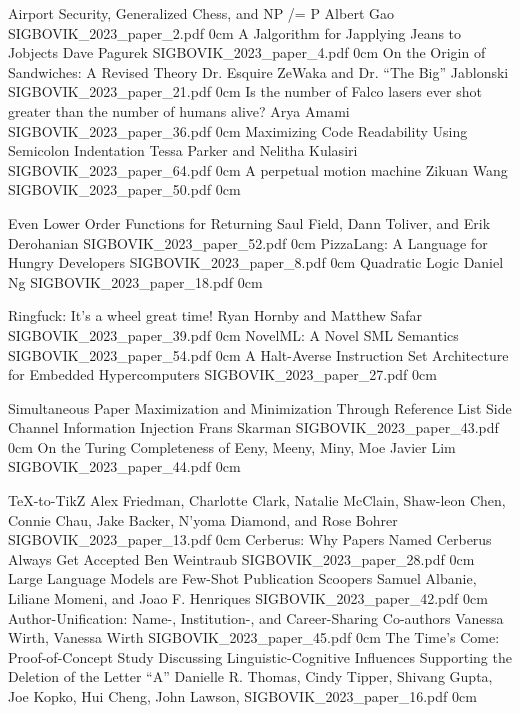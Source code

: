 \addpaper
	{Airport Security, Generalized Chess, and NP /= P}
	{Albert Gao}
	{}
	{SIGBOVIK_2023_paper_2.pdf}
	{0cm}
	{}
\addpaper
	{A Jalgorithm for Japplying Jeans to Jobjects}
	{Dave Pagurek}
	{}
	{SIGBOVIK_2023_paper_4.pdf}
	{0cm}
	{}
\addpaper
	{On the Origin of Sandwiches: A Revised Theory}
	{Dr. Esquire ZeWaka and Dr. ``The Big'' Jablonski}
	{}
	{SIGBOVIK_2023_paper_21.pdf}
	{0cm}
	{}
\addpaper
	{Is the number of Falco lasers ever shot greater than the number of humans alive?}
	{Arya Amami}
	{}
	{SIGBOVIK_2023_paper_36.pdf}
	{0cm}
	{}
\addpaper
	{Maximizing Code Readability Using Semicolon Indentation}
	{Tessa Parker and Nelitha Kulasiri}
	{}
	{SIGBOVIK_2023_paper_64.pdf}
	{0cm}
	{}
\addpaper
	{A perpetual motion machine}
	{Zikuan Wang}
	{}
	{SIGBOVIK_2023_paper_50.pdf}
	{0cm}
	{}


\addpaper
	{Even Lower Order Functions for Returning}
	{Saul Field, Dann Toliver, and Erik Derohanian }
	{}
	{SIGBOVIK_2023_paper_52.pdf}
	{0cm}
	{}
\addpaper
	{PizzaLang: A Language for Hungry Developers}
	{}
	{}
	{SIGBOVIK_2023_paper_8.pdf}
	{0cm}
	{}
\addpaper
	{Quadratic Logic}
	{Daniel Ng}
	{}
	{SIGBOVIK_2023_paper_18.pdf}
	{0cm}
	{}

\addpaper
	{Ringfuck: It's a wheel great time!}
	{Ryan Hornby and Matthew Safar}
	{}
	{SIGBOVIK_2023_paper_39.pdf}
	{0cm}
	{}
\addpaper
	{NovelML: A Novel SML Semantics}
	{}
	{}
	{SIGBOVIK_2023_paper_54.pdf}
	{0cm}
	{}
\addpaper
	{A Halt-Averse Instruction Set Architecture for Embedded Hypercomputers}
	{}
	{}
	{SIGBOVIK_2023_paper_27.pdf}
	{0cm}
	{}

\addpaper
	{Simultaneous Paper Maximization and Minimization Through Reference List Side Channel Information Injection}
	{Frans Skarman}
	{}
	{SIGBOVIK_2023_paper_43.pdf}
	{0cm}
	{}
\addpaper
	{On the Turing Completeness of Eeny, Meeny, Miny, Moe}
	{Javier Lim}
	{}
	{SIGBOVIK_2023_paper_44.pdf}
	{0cm}
	{}


\addpaper
	{TeX-to-TikZ}
	{Alex Friedman, Charlotte Clark, Natalie McClain, Shaw-leon Chen, Connie Chau, Jake Backer, N'yoma Diamond, and Rose Bohrer}
	{}
	{SIGBOVIK_2023_paper_13.pdf}
	{0cm}
	{}
\addpaper
	{Cerberus: Why Papers Named Cerberus Always Get Accepted}
	{Ben Weintraub}
	{}
	{SIGBOVIK_2023_paper_28.pdf}
	{0cm}
	{}
\addpaper
	{Large Language Models are Few-Shot Publication Scoopers}
	{Samuel Albanie, Liliane Momeni, and Joao F. Henriques}
	{}
	{SIGBOVIK_2023_paper_42.pdf}
	{0cm}
	{}
\addpaper
	{Author-Unification: Name-, Institution-, and Career-Sharing Co-authors}
	{Vanessa Wirth, Vanessa Wirth}
	{}
	{SIGBOVIK_2023_paper_45.pdf}
	{0cm}
	{}
\addpaper
	{The Time's Come: Proof-of-Concept Study Discussing Linguistic-Cognitive Influences Supporting the Deletion of the Letter ``A''}
	{Danielle R. Thomas, Cindy Tipper, Shivang Gupta, Joe Kopko, Hui Cheng, John Lawson, }
	{}
	{SIGBOVIK_2023_paper_16.pdf}
	{0cm}
	{}

